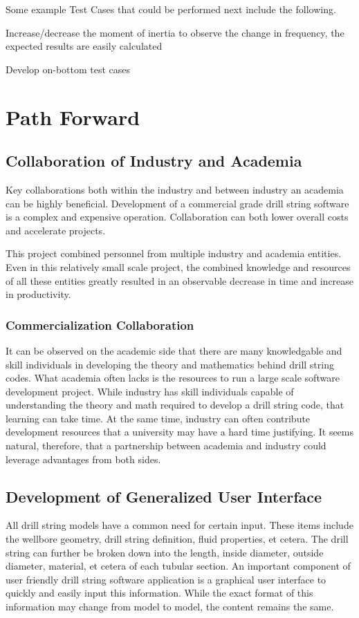 Some example Test Cases that could be performed next include the following.
\begin{bulletedlist}
	\item Increase/decrease the moment of inertia to observe the change in frequency, the expected results are easily calculated
	\item Develop on-bottom test cases
\end{bulletedlist}

\section{Path Forward}
\subsection{Collaboration of Industry and Academia}
Key collaborations both within the industry and between industry an academia can be highly beneficial.  Development of a commercial grade drill string software is a complex and expensive operation.  Collaboration can both lower overall costs and accelerate projects.

This project combined personnel from multiple industry and academia entities.  Even in this relatively small scale project, the combined knowledge and resources of all these entities greatly resulted in an observable decrease in time and increase in productivity.

\subsubsection{Commercialization Collaboration}
It can be observed on the academic side that there are many knowledgable and skill individuals in developing the theory and mathematics behind drill string codes.  What academia often lacks is the resources to run a large scale software development project.  While industry has skill individuals capable of understanding the theory and math required to develop a drill string code, that learning can take time.  At the same time, industry can often contribute development resources that a university may have a hard time justifying.  It seems natural, therefore, that a partnership between academia and industry could leverage advantages from both sides.

\subsection{Development of Generalized User Interface}
All drill string models have a common need for certain input.  These items include the wellbore geometry, drill string definition, fluid properties, et cetera.  The drill string can further be broken down into the length, inside diameter, outside diameter, material, et cetera of each tubular section.  An important component of user friendly drill string software application is a graphical user interface to quickly and easily input this information.  While the exact format of this information may change from model to model, the content remains the same.


